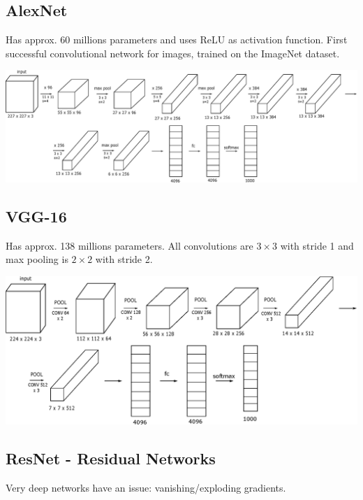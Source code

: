 \documentclass[a4paper,11pt]{report}
\begin{document}
\subsection*{AlexNet}

Has approx. 60 millions parameters and uses ReLU as activation function. First successful convolutional network for images, trained on the ImageNet dataset.

\begin{center}
\includegraphics[width = 6in]{convolutions/alexnet}
\end{center}


\subsection*{VGG-16}

Has approx. 138 millions parameters. All convolutions are $3 \times 3$ with stride 1 and max pooling is $2\times 2$ with stride 2.

\begin{center}
\includegraphics[width = 6in]{convolutions/vgg16}
\end{center}


\subsection*{ResNet - Residual Networks}

Very deep networks have an issue: vanishing/exploding gradients.

\hspace{0.3in}
\end{document}
